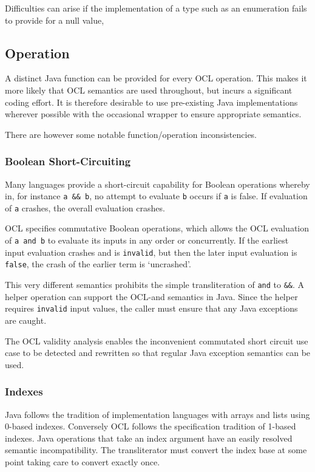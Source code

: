 \documentclass[sigconf]{acmart}
\begin{document}
Difficulties can arise if the implementation of a type such as an enumeration fails to provide for a null value,

\subsection{Operation}

A distinct Java function can be provided for every OCL operation. This makes it more likely that OCL semantics are used throughout, but incurs a significant coding effort. It is therefore desirable to use pre-existing Java implementations wherever possible with the occasional wrapper to ensure appropriate semantics.

There are however some notable function/operation inconsistencies.

\subsubsection{Boolean Short-Circuiting}

Many languages provide a short-circuit capability for Boolean operations whereby in, for instance \verb|a && b|, no attempt to evaluate \texttt{b} occurs if \texttt{a} is false. If evaluation of \texttt{a} crashes, the overall evaluation crashes.

OCL specifies commutative Boolean operations, which allows the OCL evaluation of \verb|a and b| to evaluate its inputs in any order or concurrently. If the earliest input evaluation crashes and is \texttt{invalid}, but then the later input evaluation is \texttt{false}, the crash of the earlier term is `uncrashed'.

This very different semantics prohibits the simple transliteration of \texttt{and} to \texttt{\&\&}. A helper operation can support the OCL-and semantics in Java. Since the helper requires \texttt{invalid} input values, the caller must ensure that any Java exceptions are caught.

The OCL validity analysis \cite{Willink2021} enables the inconvenient commutated short circuit use case to be detected and rewritten so that regular Java exception semantics can be used.

\subsubsection{Indexes}

Java follows the tradition of implementation languages with arrays and lists using 0-based indexes. Conversely OCL follows the specification tradition of 1-based indexes. Java operations that take an index argument have an easily resolved semantic incompatibility.
The transliterator must convert the index base at some point taking care to convert exactly once.
\end{document}
